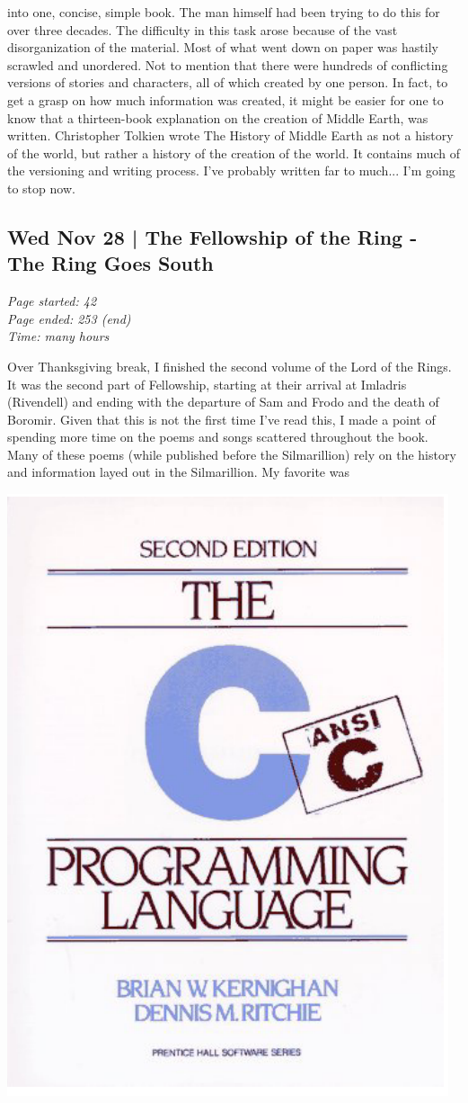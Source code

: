 \documentclass{article}
\begin{document}
into one, concise, simple book. The man himself had been trying to do this for
over three decades. The difficulty in this task arose because of the vast
disorganization of the material. Most of what went down on paper was hastily
scrawled and unordered. Not to mention that there were hundreds of conflicting
versions of stories and characters, all of which created by one person. In fact,
to get a grasp on how much information was created, it might be easier for one
to know that a thirteen-book explanation on the creation of Middle Earth, was
written. Christopher Tolkien wrote The History of Middle Earth as not a history
of the world, but rather a history of the creation of the world. It contains
much of the versioning and writing process. I've probably written far to
much... I'm going to stop now.

\subsection{Wed Nov 28 | The Fellowship of the Ring - The Ring Goes South}
\textit{Page started: 42 \\
        Page ended: 253 (end) \\
        Time: many hours \\
}

Over Thanksgiving break, I finished the second volume of the Lord of the Rings.
It was the second part of Fellowship, starting at their arrival at Imladris
(Rivendell) and ending with the departure of Sam and Frodo and the death of
Boromir. Given that this is not the first time I've read this, I made a point
of spending more time on the poems and songs scattered throughout the book.
Many of these poems (while published before the Silmarillion) rely on the
history and information layed out in the Silmarillion. My favorite was 

\pagebreak{}
\includegraphics[width=\textwidth]{images/the-c-programming-language.png}
\end{document}

